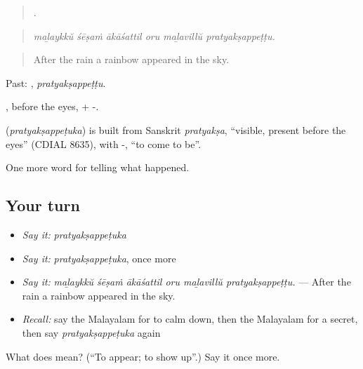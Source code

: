 \begin{quote}
     .
\end{quote}

\begin{quote}
\emph{maḻaykkŭ śēṣaṁ ākāśattil oru maḻavillŭ pratyakṣappeṭṭu.}
\end{quote}

\begin{quote}
After the rain a rainbow appeared in the sky.
\end{quote}

Past: , \emph{pratyakṣappeṭṭu}.

, before the eyes, + -.

\begin{cousinweb}
\textbf{} (\emph{pratyakṣappeṭuka}) is built from Sanskrit \emph{pratyakṣa}, \textquotedblleft{}visible, present before the eyes\textquotedblright{} (CDIAL 8635), with -, \textquotedblleft{}to come to be\textquotedblright{}.
\end{cousinweb}

\begin{grammarlens}[title={What you've built}]
One more word for telling what happened.
\end{grammarlens}

\subsection*{Your turn}
\begin{itemize}
\raggedright
  \item \emph{Say it:} \emph{pratyakṣappeṭuka}
  \item \emph{Say it:} \emph{pratyakṣappeṭuka}, once more
  \item \emph{Say it:} \emph{maḻaykkŭ śēṣaṁ ākāśattil oru maḻavillŭ pratyakṣappeṭṭu.} — After the rain a rainbow appeared in the sky.
  \item \emph{Recall:} say the Malayalam for to calm down, then the Malayalam for a secret, then say \emph{pratyakṣappeṭuka} again
\end{itemize}

\begin{tcolorbox}[breakable,colback=teal!4,colframe=teal!35!black,title={Before you move on}]
What does  mean? (\textquotedblleft{}To appear; to show up\textquotedblright{}.) Say it once more.
\end{tcolorbox}
